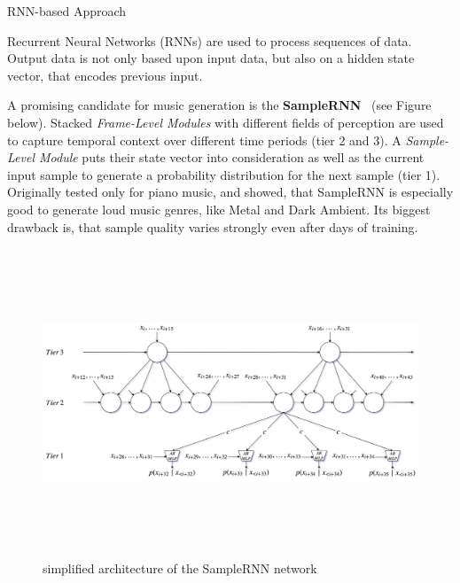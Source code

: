 \documentclass[final,hyperref={pdfpagelabels=false}]{beamer}
\newcommand{\blocktextwidth}{0.93\textwidth}
\begin{document}
\begin{frame}[t]
\begin{columns}[t]
\begin{column}{0.6375\textwidth}
\vspace{-1em}

\begin{columns}[T]


\begin{column}{0.486\textwidth}


\begin{block}{RNN-based Approach}
\begin{minipage}[]{\blocktextwidth}
Recurrent Neural Networks (RNNs) are used to process sequences of data.
Output data is not only based upon input data, but also on a hidden state vector, that encodes previous input.

A promising candidate for music generation is the \textbf{SampleRNN}~\cite{mehri2016samplernn} (see Figure below).
Stacked \emph{Frame-Level Modules} with different fields of perception are used to capture temporal context over different time periods (tier 2 and 3).
A \emph{Sample-Level Module} puts their state vector into consideration as well as the current input sample to generate a probability distribution for the next sample (tier 1).
Originally tested only for piano music, \cite{zukowski2018generating} and \cite{carr2018generating} showed, that SampleRNN is especially good to generate loud music genres, like Metal and Dark Ambient.
Its biggest drawback is, that sample quality varies strongly even after days of training.
\begin{figure}[ht]
    \label{fig:samplernn}
    \includegraphics[height=92mm]{samplernn.png}
    \caption*{simplified architecture of the SampleRNN network}
\end{figure}
\end{minipage}
\end{block}





\end{column}
\end{columns}
\end{column}
\end{columns}
\end{frame}
\end{document}
